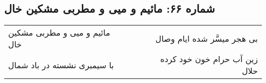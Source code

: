 \begin{center}
\section*{شماره ۶۶: مائیم و میی و مطربی مشکین خال}
\label{sec:066}
\begin{longtable}{l p{0.5cm} r}
مائیم و میی و مطربی مشکین خال
&&
بی هجر میسَّر شده ایام وصال
\\
با سیمبری نشسته در باد شمال
&&
زین آب حرام خون خود کرده حلال
\\
\end{longtable}
\end{center}
